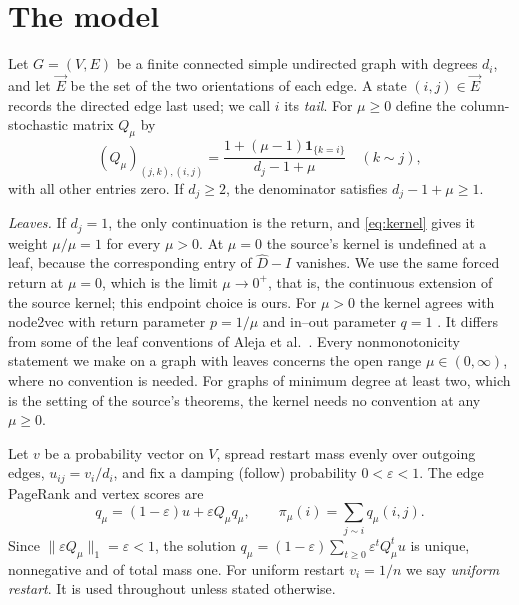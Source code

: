 \documentclass[11pt,a4paper]{article}
\theoremstyle{definition}\newtheorem{conjecture}{Conjecture}
\theoremstyle{remark}\newtheorem{remark}[theorem]{Remark}
\newcommand{\eps}{\varepsilon}
\begin{document}
\section{The model}\label{sec:model}
Let $G=(V,E)$ be a finite connected simple undirected graph with degrees $d_i$, and let $\vec E$ be the set of the two orientations of each edge. A state $(i,j)\in\vec E$ records the directed edge last used; we call $i$ its \emph{tail}. For $\mu\geq0$ define the column-stochastic matrix $Q_\mu$ by
\begin{equation}\label{eq:kernel}
 (Q_\mu)_{(j,k),(i,j)}=
 \frac{1+(\mu-1)\mathbf{1}_{\{k=i\}}}{d_j-1+\mu}
 \quad(k\sim j),
\end{equation}
with all other entries zero. If $d_j\geq2$, the denominator satisfies $d_j-1+\mu\geq1$.

\emph{Leaves.} If $d_j=1$, the only continuation is the return, and \eqref{eq:kernel} gives it weight $\mu/\mu=1$ for every $\mu>0$. At $\mu=0$ the source's kernel is undefined at a leaf, because the corresponding entry of $\hat D-I$ vanishes. We use the same forced return at $\mu=0$, which is the limit $\mu\to0^+$, that is, the continuous extension of the source kernel; this endpoint choice is ours. For $\mu>0$ the kernel agrees with node2vec with return parameter $p=1/\mu$ and in--out parameter $q=1$ \cite{grover,meng}. It differs from some of the leaf conventions of Aleja et al.\ \cite{aleja}. Every nonmonotonicity statement we make on a graph with leaves concerns the open range $\mu\in(0,\infty)$, where no convention is needed. For graphs of minimum degree at least two, which is the setting of the source's theorems, the kernel needs no convention at any $\mu\geq0$.

Let $v$ be a probability vector on $V$, spread restart mass evenly over outgoing edges, $u_{ij}=v_i/d_i$, and fix a damping (follow) probability $0<\eps<1$. The edge PageRank and vertex scores are
\begin{equation}\label{eq:balance}
 q_\mu=(1-\eps)u+\eps Q_\mu q_\mu,
 \qquad
 \pi_\mu(i)=\sum_{j\sim i}q_\mu(i,j).
\end{equation}
Since $\|\eps Q_\mu\|_1=\eps<1$, the solution $q_\mu=(1-\eps)\sum_{t\geq0}\eps^tQ_\mu^tu$ is unique, nonnegative and of total mass one. For uniform restart $v_i=1/n$ we say \emph{uniform restart}. It is used throughout unless stated otherwise.
\end{document}
